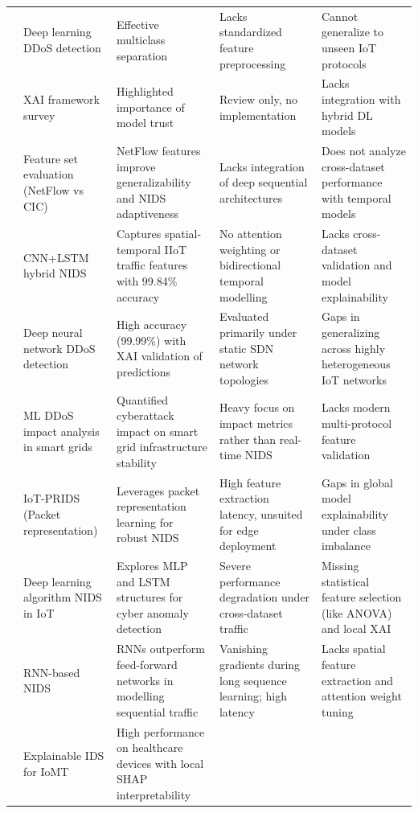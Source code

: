 \documentclass[a4paper,fleqn]{cas-sc}
\begin{document}
{\begin{landscape}
\begin{longtable}{p{4cm}p{4cm}p{4cm}p{4cm}p{4cm}}
\cite{basnet2022deep} &
  Deep learning DDoS detection &
  Effective multiclass separation &
  Lacks standardized feature preprocessing &
  Cannot generalize to unseen IoT protocols \\
\cite{almimi2023xai} &
  XAI framework survey &
  Highlighted importance of model trust &
  Review only, no implementation &
  Lacks integration with hybrid DL models \\
\cite{sarhan2020evaluation} &
  Feature set evaluation (NetFlow vs CIC) &
  NetFlow features improve generalizability and NIDS adaptiveness &
  Lacks integration of deep sequential architectures &
  Does not analyze cross-dataset performance with temporal models \\
\cite{yan2023deep} &
  CNN+LSTM hybrid NIDS &
  Captures spatial-temporal IIoT traffic features with 99.84\% accuracy &
  No attention weighting or bidirectional temporal modelling &
  Lacks cross-dataset validation and model explainability \\
\cite{hnamte2024iot} &
  Deep neural network DDoS detection &
  High accuracy (99.99\%) with XAI validation of predictions &
  Evaluated primarily under static SDN network topologies &
  Gaps in generalizing across highly heterogeneous IoT networks \\
\cite{sgouras2022detecting} &
  ML DDoS impact analysis in smart grids &
  Quantified cyberattack impact on smart grid infrastructure stability &
  Heavy focus on impact metrics rather than real-time NIDS &
  Lacks modern multi-protocol feature validation \\
\cite{hosseini2024attention} &
  IoT-PRIDS (Packet representation) &
  Leverages packet representation learning for robust NIDS &
  High feature extraction latency, unsuited for edge deployment &
  Gaps in global model explainability under class imbalance \\
\cite{susilo2020security} &
  Deep learning algorithm NIDS in IoT &
  Explores MLP and LSTM structures for cyber anomaly detection &
  Severe performance degradation under cross-dataset traffic &
  Missing statistical feature selection (like ANOVA) and local XAI \\
\cite{yin2020deep} &
  RNN-based NIDS &
  RNNs outperform feed-forward networks in modelling sequential traffic &
  Vanishing gradients during long sequence learning; high latency &
  Lacks spatial feature extraction and attention weight tuning \\
\cite{shaaban2023biomt} &
  Explainable IDS for IoMT &
  High performance on healthcare devices with local SHAP interpretability &

\end{longtable}
\end{landscape}}
\end{document}
